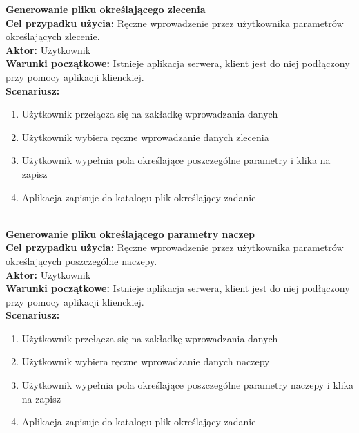 	\textbf{Generowanie pliku określającego zlecenia}\\
	\textbf{Cel przypadku użycia:} Ręczne wprowadzenie przez użytkownika parametrów określających zlecenie.\\
	\textbf{Aktor:} Użytkownik\\
	\textbf{Warunki początkowe:} Istnieje aplikacja serwera, klient jest do niej podłączony przy pomocy aplikacji klienckiej.\\
	\textbf{Scenariusz:}
	\begin{enumerate}
	\item Użytkownik przełącza się na zakładkę wprowadzania danych
	\item Użytkownik wybiera ręczne wprowadzanie danych zlecenia
	\item Użytkownik wypełnia pola określające poszczególne parametry i klika na zapisz
	\item Aplikacja zapisuje do katalogu plik określający zadanie\\\\
	\end{enumerate}
	
		\textbf{Generowanie pliku określającego parametry naczep}\\
	\textbf{Cel przypadku użycia:} Ręczne wprowadzenie przez użytkownika parametrów określających poszczególne naczepy.\\
	\textbf{Aktor:} Użytkownik\\
	\textbf{Warunki początkowe:} Istnieje aplikacja serwera, klient jest do niej podłączony przy pomocy aplikacji klienckiej.\\
	\textbf{Scenariusz:}
	\begin{enumerate}
	\item Użytkownik przełącza się na zakładkę wprowadzania danych
	\item Użytkownik wybiera ręczne wprowadzanie danych naczepy
	\item Użytkownik wypełnia pola określające poszczególne parametry naczepy i klika na zapisz
	\item Aplikacja zapisuje do katalogu plik określający zadanie\\\\
	\end{enumerate}
	
